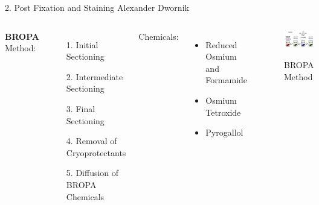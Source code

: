 \documentclass[10pt]{beamer}
\begin{document}
\begin{frame}{2. Post Fixation and Staining\hspace{0pt plus 1 filll} \small{Alexander Dwornik}}

\begin{columns}[T,onlytextwidth]
		\vspace{0.2cm}
		\textbf{BROPA} \\
				Method: \cite{BROPA}
\begin{itemize}
	\item[1.] Initial Sectioning
	\item[2.] Intermediate Sectioning 
	\item[3.] Final Sectioning
	\item[4.] Removal of Cryoprotectants
	\item[5.] Diffusion of BROPA Chemicals
\end{itemize}	
Chemicals:
\begin{itemize}[label={$\bullet$}]
	\item Reduced Osmium and Formamide
	\item Osmium Tetroxide
	\item Pyrogallol
\end{itemize}
		\vspace{0.5cm}
		\begin{figure}
			\centering
			\includegraphics[totalheight=3cm,width=.3\paperwidth]{bropa.png}
			\caption \small  BROPA Method \cite{BROPA}
		\end{figure}
	\end{columns}
\end{frame}
\end{document}
